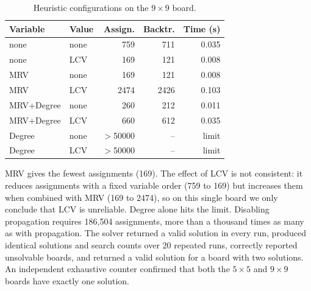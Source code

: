 \begin{table}[t]
\caption{Heuristic configurations on the $9\times9$ board.}
\label{tab:kakuro}
\centering
\begin{tabular}{llrrr}
\hline
Variable & Value & Assign. & Backtr. & Time (s) \\
\hline
none & none & 759 & 711 & 0.035 \\
none & LCV & 169 & 121 & 0.008 \\
MRV & none & 169 & 121 & 0.008 \\
MRV & LCV & 2474 & 2426 & 0.103 \\
MRV+Degree & none & 260 & 212 & 0.011 \\
MRV+Degree & LCV & 660 & 612 & 0.035 \\
Degree & none & $>$50000 & -- & limit \\
Degree & LCV & $>$50000 & -- & limit \\
\hline
\end{tabular}
\end{table}

MRV gives the fewest assignments (169). The effect of LCV is not consistent: it reduces assignments with a fixed variable order (759 to 169) but increases them when combined with MRV (169 to 2474), so on this single board we only conclude that LCV is unreliable. Degree alone hits the limit. Disabling propagation requires 186{,}504 assignments, more than a thousand times as many as with propagation. The solver returned a valid solution in every run, produced identical solutions and search counts over 20 repeated runs, correctly reported unsolvable boards, and returned a valid solution for a board with two solutions. An independent exhaustive counter confirmed that both the $5\times5$ and $9\times9$ boards have exactly one solution.
